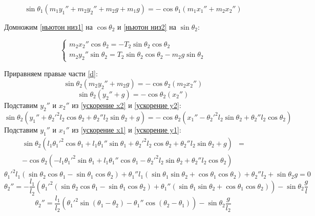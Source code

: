\documentclass[12pt, a4paper]{article}
\begin{document}
\begin{equation}
    \sin\theta_1 (m_1y_1'' + m_2y_2'' + m_2g + m_1g) = - \cos \theta_1 (m_1x_1'' + m_2x_2'') \label{c}
\end{equation}

Домножим \eqref{ньютон низ1} на \(\cos \theta_2\) и \eqref{ньютон низ2} на \(\sin \theta_2\):

\begin{equation}
    \begin{cases}
        m_2x_2''\cos \theta_2 = - T_2 \sin \theta_2\cos \theta_2 \\
        m_2y_2''\sin \theta_2 = T_2 \sin \theta_2\cos \theta_2 - m_2g\sin \theta_2
    \end{cases} \label{d}
\end{equation}

Приравняем правые части \eqref{d}:
\begin{equation}
    \sin \theta_2 (m_2y_2'' + m_2g) = - \cos \theta_2(m_2x_2'')
\end{equation}
\begin{equation}
    \sin \theta_2 (y_2'' + g) = - \cos \theta_2(x_2'')
\end{equation}
Подставим \(y_2''\) и \(x_2''\) из \eqref{ускорение x2} и \eqref{ускорение y2}:
\begin{equation}
    \sin \theta_2 (y_1'' + \theta_2'^2 l_2 \cos \theta_2 + \theta_2'' l_2 \sin \theta_2 + g) = - \cos \theta_2(x_1'' - \theta_2'^2 l_2 \sin \theta_2 + \theta_2'' l_2 \cos \theta_2)
\end{equation}
Подставим \(y_1''\) и \(x_1''\) из \eqref{ускорение x1} и \eqref{ускорение y1}:
\begin{align}
    \sin \theta_2 (l_1 \theta_1'^2 \cos \theta_1 + l_1 \theta_1'' \sin \theta_1 + \theta_2'^2 l_2 \cos \theta_2 + \theta_2'' l_2 \sin \theta_2 + g) & = \label{f} \\
    - \cos \theta_2(-l_1 \theta_1'^2 \sin \theta_1 + l_1 \theta_1'' \cos \theta_1 - \theta_2'^2 l_2 \sin \theta_2 + \theta_2'' l_2 \cos \theta_2) \nonumber
\end{align}
\begin{equation}
    \theta_1'^2 l_1 (\sin \theta_2 \cos \theta_1 - \sin \theta_1 \cos \theta_2) + \theta_1'' l_1 (\sin \theta_1 \sin \theta_2 + \cos \theta_1 \cos \theta_2) + \theta_2'' l_2 + \sin \theta_2 g = 0
\end{equation}
\begin{equation}
    \theta_2'' = -\frac{l_1}{l_2} (\theta_1'^2 (\sin \theta_2 \cos \theta_1 - \sin \theta_1 \cos \theta_2) + \theta_1'' (\sin \theta_1 \sin \theta_2 + \cos \theta_1 \cos \theta_2)) - \sin \theta_2 \frac{g}{l}
\end{equation}
\begin{equation}
    \theta_2'' = \frac{l_1}{l_2} (\theta_1'^2 \sin (\theta_1 - \theta_2) - \theta_1'' \cos(\theta_2 - \theta_1)) - \sin \theta_2 \frac{g}{l_2} \label{тета2}
\end{equation}
\end{document}
